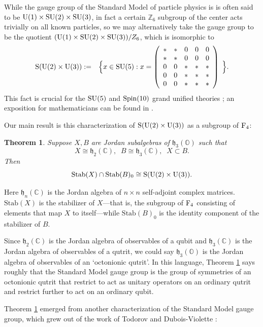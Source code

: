 \documentclass{article}
\theoremstyle{plain}
\newtheorem{thm}{Theorem}
\theoremstyle{remark}
\theoremstyle{definition}
\newcommand{\C}{{\mathbb C}}  %
\newcommand{\Z}{{\mathbb Z}}  %
\renewcommand{\O}{{\mathbb O}}  %
\newcommand{\U}{{\rm U}}    %
\newcommand{\SU}{{\rm SU}}    %
\newcommand{\Spin}{{\rm Spin}}    %
\newcommand{\F}{{\rm F}}       %
\newcommand{\Stab}{\mathrm{Stab}} %
\renewcommand{\S}{\mathrm{S}} %
\newcommand{\h}{\mathfrak{h}}  %
\begin{document}
While the gauge group of the Standard Model of particle physics is is often said to be $\U(1) \times \SU(2) \times \SU(3)$, in fact a certain $\Z_6$ subgroup of the center acts trivially on all known particles, so we may alternatively take the gauge group to be the quotient $(\U(1) \times \SU(2) \times \SU(3))/Z_6$, which is isomorphic to
\[  \begin{array}{ccl} 
 \S(\U(2) \times \U(3)) := &
\Big\{ x \in \SU(5) : x = 
\left( 
\begin{array}{c c c c c}
\ast & \ast & 0 & 0 & 0 \\
\ast & \ast & 0 & 0 & 0 \\
0 & 0 & \ast & \ast & \ast \\
0 & 0 & \ast & \ast & \ast \\
0 & 0 & \ast & \ast & \ast 
\end{array}
\right) \; \Big\}.  
\end{array}
\]
This fact is crucial for the $\SU(5)$ and $\Spin(10)$ grand unified theories \cite{Georgi,GeorgiGlashow}; an exposition for mathematicians can be found in \cite{BH}.

Our main result is this characterization of $\S(\U(2) \times \U(3))$ as a subgroup of $\F_4$:

\begin{thm}
\label{thm:1}
Suppose $X,B$ are Jordan subalgebras of $\h_3(\O)$ such that
\[  X \cong \h_2(\C), \;\; B \cong \h_3(\C), \;\; X \subset B . \]
Then 
\[     \Stab(X) \cap \Stab(B)_0 \cong \S(\U(2) \times \U(3)). \]
\end{thm}
\noindent Here $\h_n(\C)$ is the Jordan algebra of $n \times n$ self-adjoint complex matrices.  $\Stab(X)$ is the stabilizer of $X$---that is, the subgroup of $\F_4$ consisting of elements that map $X$ to itself---while $\Stab(B)_0$ is the identity component of the stabilizer of $B$.   

Since $\h_2(\C)$ is the Jordan algebra of observables of a qubit and $\h_3(\C)$ is the Jordan algebra of observables of a qutrit, we could say $\h_3(\O)$ is the Jordan algebra of observables of an `octonionic qutrit'.   In this language, Theorem \ref{thm:1} says roughly that the Standard Model gauge group is the group of symmetries of an octonionic qutrit that restrict to act as unitary operators on an ordinary qutrit and restrict further to act on an ordinary qubit. 

Theorem \ref{thm:1} emerged from another characterization of the Standard Model gauge group, which grew out of the work of Todorov and Dubois-Violette \cite{TDV}:
\end{document}
